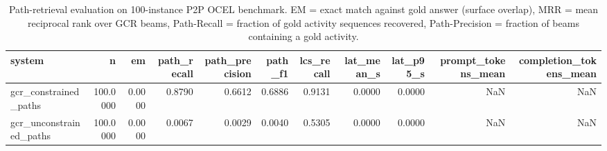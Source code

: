 \begin{table}
\caption{Path-retrieval evaluation on 100-instance P2P OCEL benchmark. EM = exact match against gold answer (surface overlap), MRR = mean reciprocal rank over GCR beams, Path-Recall = fraction of gold activity sequences recovered, Path-Precision = fraction of beams containing a gold activity.}
\label{tab:path_results}
\begin{tabular}{lrrrrrrrrrr}
\toprule
system & n & em & path_recall & path_precision & path_f1 & lcs_recall & lat_mean_s & lat_p95_s & prompt_tokens_mean & completion_tokens_mean \\
\midrule
gcr_constrained_paths & 100.0000 & 0.0000 & 0.8790 & 0.6612 & 0.6886 & 0.9131 & 0.0000 & 0.0000 & NaN & NaN \\
gcr_unconstrained_paths & 100.0000 & 0.0000 & 0.0067 & 0.0029 & 0.0040 & 0.5305 & 0.0000 & 0.0000 & NaN & NaN \\
\bottomrule
\end{tabular}
\end{table}
